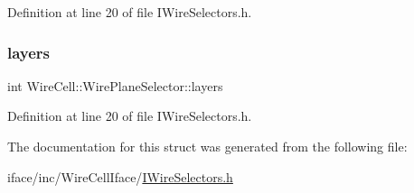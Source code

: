Definition at line 20 of file I\+Wire\+Selectors.\+h.

\mbox{\label{struct_wire_cell_1_1_wire_plane_selector_af7a3a8d2aeff9d587c24a211be1757c5}} 
\subsubsection{\texorpdfstring{layers}{layers}}
{\footnotesize\ttfamily int Wire\+Cell\+::\+Wire\+Plane\+Selector\+::layers}



Definition at line 20 of file I\+Wire\+Selectors.\+h.



The documentation for this struct was generated from the following file\+:\begin{DoxyCompactItemize}
\item 
iface/inc/\+Wire\+Cell\+Iface/\hyperlink{_i_wire_selectors_8h}{I\+Wire\+Selectors.\+h}\end{DoxyCompactItemize}
